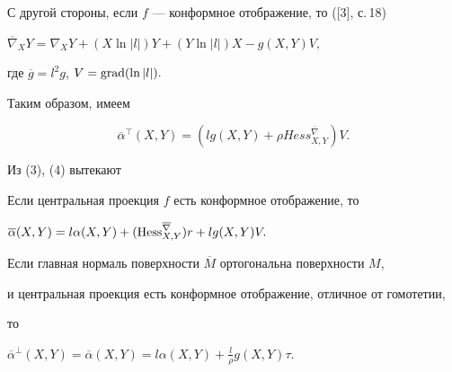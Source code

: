 С другой стороны, если $f$ --- конформное отображение, то ([3], с.\,18)


$\overline{\nabla}_{X}Y=\nabla_{X}Y+(X\ln|l|)Y+(Y\ln|l|)X-g(X,Y)V,$


где $\overline{g}=l^{2}g$, $V=\operatorname{grad}(\ln|l|).$


Таким образом, имеем                            


\begin{equation}


\overline{\alpha}^{\top}(X,Y)=


(l g(X,Y)+\rho Hess_{X,Y}^{\overline{\nabla}})V.


\end{equation}





Из (3), (4) вытекают





\begin{thm}


Если центральная проекция $f$ есть конформное отображение, то


$\overline{\alpha} (X,Y)= l\alpha (X,Y)+ (\Hess_{X,Y}^{\overline{\nabla}})r +


l g(X,Y)V.$


\end{thm}





\begin{cor}


Если главная нормаль поверхности $\overline{M}$ ортогональна поверхности $M$,


и центральная проекция есть конформное отображение, отличное от гомотетии, 


то


$\overline{\alpha} ^{\bot}(X,Y)= \overline{\alpha}(X,Y)=l\alpha(X,Y)+


\frac{l}{\rho} g(X,Y)\tau$.


\end{cor} 





